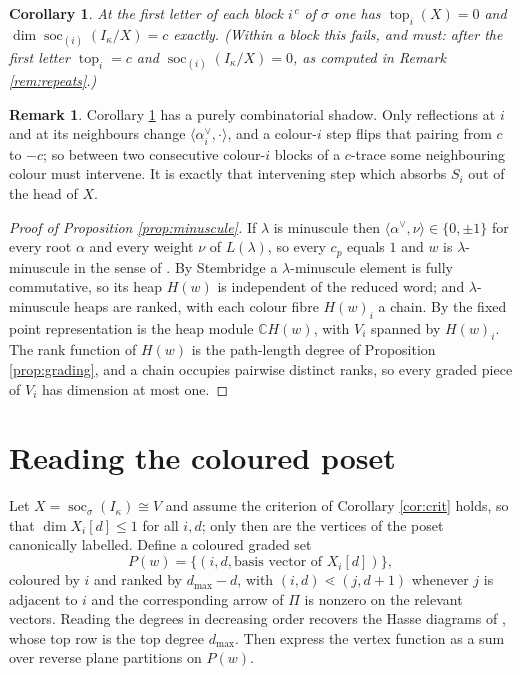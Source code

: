 \documentclass[11pt,reqno]{amsart}
\theoremstyle{plain}
\newtheorem{corollary}[theorem]{Corollary}
\theoremstyle{definition}
\newtheorem{remark}[theorem]{Remark}
\DeclareMathOperator{\soc}{soc}
\DeclareMathOperator{\topp}{top}
\newcommand{\bbC}{\mathbb{C}}
\newcommand{\Pia}{\Pi}
\newcommand{\al}{\alpha}
\newcommand{\la}{\lambda}
\newcommand{\ka}{\kappa}
\begin{document}
\begin{corollary}\label{cor:tops}
At the \emph{first} letter of each block $i^{\,c}$ of $\sigma$ one has
$\topp_{i}(X)=0$ and $\dim\soc_{(i)}(I_\ka/X)=c$ exactly.  (Within a block
this fails, and must: after the first letter $\topp_i=c$ and
$\soc_{(i)}(I_\ka/X)=0$, as computed in Remark \ref{rem:repeats}.)
\end{corollary}

\begin{remark}
Corollary \ref{cor:tops} has a purely combinatorial shadow.  Only reflections
at $i$ and at its neighbours change $\langle\al_i^\vee,\cdot\rangle$, and a
colour-$i$ step flips that pairing from $c$ to $-c$; so between two consecutive
colour-$i$ blocks of a $c$-trace some neighbouring colour must intervene.  It
is exactly that intervening step which absorbs $S_i$ out of the head of $X$.
\end{remark}

\begin{proof}[Proof of Proposition \ref{prop:minuscule}]
If $\la$ is minuscule then $\langle\al^\vee,\nu\rangle\in\{0,\pm1\}$ for every
root $\al$ and every weight $\nu$ of $L(\la)$, so every $c_p$ equals $1$ and
$w$ is $\la$-minuscule in the sense of \cite[Def.~5.1]{DKK}.  By Stembridge
\cite[Prop.~2.1, \S2]{Stem} a $\la$-minuscule element is fully commutative, so
its heap $H(w)$ is independent of the reduced word; and $\la$-minuscule heaps
are ranked, with each colour fibre $H(w)_i$ a chain.  By \cite[Prop.~3.8, Lem.~3.10]{DFKKMSSVW} the fixed
point representation is the heap module $\bbC H(w)$, with $V_i$ spanned by
$H(w)_i$.  The rank function of $H(w)$ is the path-length degree of Proposition
\ref{prop:grading}, and a chain occupies pairwise distinct ranks, so every
graded piece of $V_i$ has dimension at most one.
\end{proof}

\section{Reading the coloured poset}\label{sec:poset}

Let $X=\soc_\sigma(I_\ka)\cong V$ and assume the criterion of Corollary
\ref{cor:crit} holds, so that $\dim X_i[d]\le1$ for all $i,d$; only then are
the vertices of the poset canonically labelled.  Define a coloured graded set
\[
  P(w)=\bigl\{(i,d,\text{basis vector of }X_i[d])\bigr\},
\]
coloured by $i$ and ranked by $d_{\max}-d$, with $(i,d)\lessdot(j,d+1)$ whenever
$j$ is adjacent to $i$ and the corresponding arrow of $\Pia$ is nonzero on the
relevant vectors.  Reading the degrees in decreasing order recovers the Hasse
diagrams of \cite[\S5.4]{DKK}, whose top row is the top degree $d_{\max}$.  Then
\cite[Thm.~5.6, Thm.~5.7]{DKK} express the vertex function as a sum over
reverse plane partitions on $P(w)$.
\end{document}
